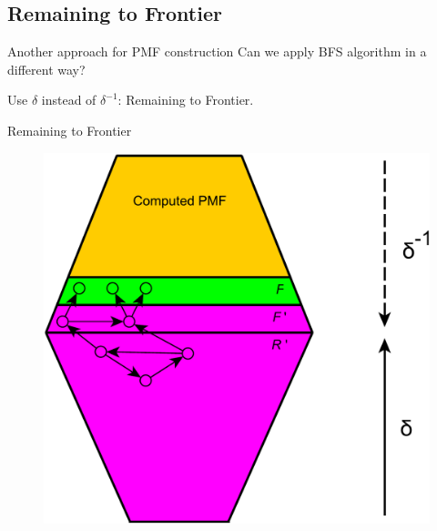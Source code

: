 \documentclass{beamer}
\begin{document}
\subsection{Remaining to Frontier}

\begin{frame}{Another approach for PMF construction}
Can we apply BFS algorithm in a different way?

Use $\delta$ instead of $\delta^{-1}$: \alert{Remaining to Frontier}.
\end{frame}


\begin{frame}{Remaining to Frontier}
	\begin{figure}
		\includegraphics[height=0.8\textheight]{figs/r2f.pdf}
		\caption{}
	\end{figure}
\end{frame}
\end{document}
